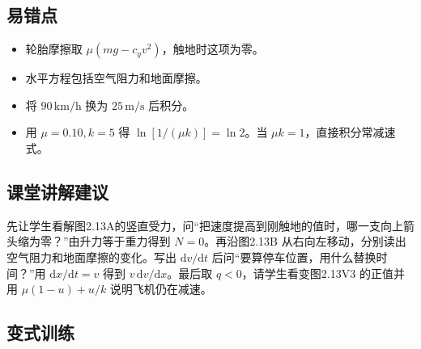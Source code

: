 \documentclass[UTF8,fontset=fandol,a4paper,11pt]{ctexart}
\begin{document}


\subsection*{易错点}

\begin{itemize}
\item 轮胎摩擦取 $\mu(mg-c_yv^2)$，触地时这项为零。
\item 水平方程包括空气阻力和地面摩擦。
\item 将 $90\,\mathrm{km/h}$ 换为 $25\,\mathrm{m/s}$ 后积分。
\item 用 $\mu=0.10,k=5$ 得 $\ln[1/(\mu k)]=\ln2$。当 $\mu k=1$，直接积分常减速式。
\end{itemize}



\subsection*{课堂讲解建议}

先让学生看解图2.13A的竖直受力，问“把速度提高到刚触地的值时，哪一支向上箭头缩为零？”由升力等于重力得到 $N=0$。再沿图2.13B 从右向左移动，分别读出空气阻力和地面摩擦的变化。写出 $\mathrm dv/\mathrm dt$ 后问“要算停车位置，用什么替换时间？”用 $\mathrm dx/\mathrm dt=v$ 得到 $v\,\mathrm dv/\mathrm dx$。最后取 $q<0$，请学生看变图2.13V3 的正值并用 $\mu(1-u)+u/k$ 说明飞机仍在减速。



\subsection*{变式训练}
\end{document}
